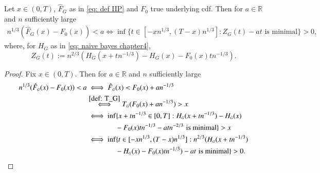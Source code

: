 \begin{lemma}\label{lemma: rewriting1}
Let $x \in (0,T)$, $\hat{F}_{\scriptscriptstyle{G}}$ as in \eqref{eq: def IIP} and $F_0$ true underlying cdf. Then for $a \in \mathbb{R}$ and $n$ sufficiently large
\begin{align*}
n^{1/3} (\hat{F}_{\scriptscriptstyle{G}}(x) - F_0(x)) < a \iff \inf \{ t \in [-x n^{1/3}, (T-x) n^{1/3}] : Z_{\scriptscriptstyle{G}}(t) - a t \, \, \text{is minimal} \} > 0,
\end{align*}
where, for $H_{\scriptscriptstyle{G}}$ as in \eqref{eq: naive bayes chapter4},
\[
Z_{\scriptscriptstyle{G}}(t) := n^{2/3} \left( H_{\scriptscriptstyle{G}}(x + t n^{-1/3}) - H_{\scriptscriptstyle{G}}(x) - F_0(x) t n^{-1/3} \right).
\]
\end{lemma}
\begin{proof}
Fix $x \in (0,T)$. Then for $a \in \mathbb{R}$ and $n$ sufficiently large
\begin{align*}
n^{1/3} (\hat{F}_{\scriptscriptstyle{G}}(x) - F_0(x)) < a &\iff \hat{F}_{\scriptscriptstyle{G}}(x) < F_0(x) + a n^{-1/3} \\
&\stackrel{\eqref{def: T_G}}{\iff} T_{\scriptscriptstyle{G}}(F_0(x) + a n^{-1/3}) > x \\
&\iff \inf \{ x + t n^{-1/3} \in [0,T] : H_{\scriptscriptstyle{G}}(x + t n^{-1/3}) - H_{\scriptscriptstyle{G}}(x) \\
& \qquad \quad \quad - F_0(x) t n^{-1/3} - a t n^{-2/3} \, \, \text{is minimal} \} > x \\
&\iff \inf \{ t \in [-x n^{1/3}, (T-x) n^{1/3}] : n^{2/3} (H_{\scriptscriptstyle{G}}(x + t n^{-1/3}) \\
& \qquad \quad \quad - H_{\scriptscriptstyle{G}}(x) - F_0(x) t n^{-1/3}) - a t \, \, \text{is minimal} \} > 0.
\end{align*}
\end{proof}

